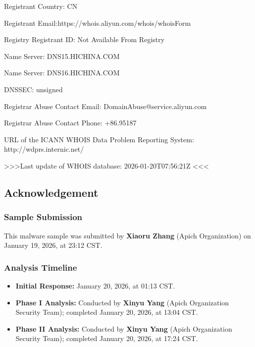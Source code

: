 \documentclass[
]{article}
\newenvironment{Shaded}{}{}
\newcommand{\NormalTok}[1]{#1}
\begin{document}
\begin{Shaded}
\begin{Highlighting}[]
\NormalTok{Registrant Country: CN}

\NormalTok{Registrant Email:https://whois.aliyun.com/whois/whoisForm}

\NormalTok{Registry Registrant ID: Not Available From Registry}

\NormalTok{Name Server: DNS15.HICHINA.COM}

\NormalTok{Name Server: DNS16.HICHINA.COM}

\NormalTok{DNSSEC: unsigned}

\NormalTok{Registrar Abuse Contact Email: DomainAbuse@service.aliyun.com}

\NormalTok{Registrar Abuse Contact Phone: +86.95187}

\NormalTok{URL of the ICANN WHOIS Data Problem Reporting System: http://wdprs.internic.net/}

\NormalTok{\textgreater{}\textgreater{}\textgreater{}Last update of WHOIS database: 2026{-}01{-}20T07:56:21Z \textless{}\textless{}\textless{}}
\end{Highlighting}
\end{Shaded}

\subsection{Acknowledgement}\label{acknowledgement}

\subsubsection{\texorpdfstring{\textbf{Sample
Submission}}{Sample Submission}}\label{sample-submission}

This malware sample was submitted by \textbf{Xiaoru Zhang} (Apich
Organization) on January 19, 2026, at 23:12 CST.

\subsubsection{\texorpdfstring{\textbf{Analysis
Timeline}}{Analysis Timeline}}\label{analysis-timeline}

\begin{itemize}
\item
  \textbf{Initial Response:} January 20, 2026, at 01:13 CST.
\item
  \textbf{Phase I Analysis:} Conducted by \textbf{Xinyu Yang} (Apich
  Organization Security Team); completed January 20, 2026, at 13:04 CST.
\item
  \textbf{Phase II Analysis:} Conducted by \textbf{Xinyu Yang} (Apich
  Organization Security Team); completed January 20, 2026, at 17:24 CST.
\end{itemize}
\end{document}
